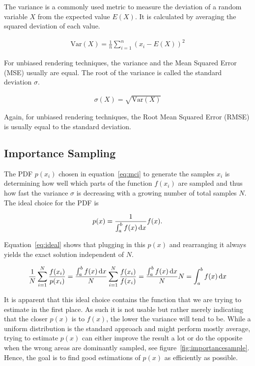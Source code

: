 The variance is a commonly used metric to measure the deviation of a random variable $X$ from the expected value $E(X)$. It is calculated by averaging the squared deviation of each value.

\begin{align}
 \text{Var}(X) = \frac{1}{n} \sum_{i=1}^{n}(x_i - E(X))^2
\end{align}

For unbiased rendering techniques, the variance and the Mean Squared Error (MSE) usually are equal. The root of the variance is called the standard deviation $\sigma$.

\begin{align}
 \sigma(X) = \sqrt{\text{Var}(X)}
\end{align}

Again, for unbiased rendering techniques, the Root Mean Squared Error (RMSE) is usually equal to the standard deviation.

\subsection{Importance Sampling}
\label{sec:IS}

The PDF $p(x_i)$ chosen in equation~\ref{eq:mci} to generate the samples $x_i$ is determining how well which parts of the function $f(x_i)$ are sampled and thus how fast the variance $\sigma$ is decreasing with a growing number of total samples $N$. The ideal choice for the PDF is 

\begin{align}
 p(x) = \frac{1}{\int_a^b f(x) \mathop{}\!\mathrm{d} x} f(x).
\end{align}

Equation~\ref{eq:ideal} shows that plugging in this $p(x)$ and rearranging it always yields the exact solution independent of $N$.

\begin{align}
 \label{eq:ideal}
 \frac{1}{N} \sum_{i=1}^{N} \frac{f(x_i)}{p(x_i)} = \frac{\int_a^b f(x) \mathop{}\!\mathrm{d} x}{N} \sum_{i=1}^N \frac{f(x_i)}{f(x_i)} = \frac{\int_a^b f(x) \mathop{}\!\mathrm{d} x}{N} N = \int_a^b f(x) \mathop{}\!\mathrm{d} x
\end{align}

It is apparent that this ideal choice contains the function that we are trying to estimate in the first place. As such it is not usable but rather merely indicating that the closer $p(x)$ is to $f(x)$, the lower the variance will tend to be. While a uniform distribution is the standard approach and might perform mostly average, trying to estimate $p(x)$ can either improve the result a lot or do the opposite when the wrong areas are dominantly sampled, see figure~\ref{fig:importancesample}. Hence, the goal is to find good estimations of $p(x)$ as efficiently as possible.


